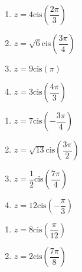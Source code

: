 \documentclass{ximera}
\begin{document}
\begin{multicols}{4} 

\begin{enumerate}

\setcounter{enumi}{\value{HW}}

\item $z = 4\text{cis}\left(\dfrac{2\pi}{3}\right)$ 
\item $z = \sqrt{6}\text{cis}\left(\dfrac{3\pi}{4}\right)$ 
\item $z = 9\text{cis}\left(\pi\right)$ 
\item $z = 3\text{cis}\left(\dfrac{4\pi}{3}\right)$

\setcounter{HW}{\value{enumi}}

\end{enumerate}

\end{multicols}

\begin{multicols}{4} 

\begin{enumerate}

\setcounter{enumi}{\value{HW}}

\item $z = 7\text{cis}\left(-\dfrac{3\pi}{4}\right)$ 
\item \small $z = \sqrt{13}\text{cis}\left(\dfrac{3\pi}{2}\right)$ \normalsize
\item $z = \dfrac{1}{2}\text{cis}\left(\dfrac{7\pi}{4}\right)$ 
\item $z = 12\text{cis}\left(-\dfrac{\pi}{3}\right)$ 

\setcounter{HW}{\value{enumi}}

\end{enumerate}

\end{multicols}

\begin{multicols}{2} 

\begin{enumerate}

\setcounter{enumi}{\value{HW}}

\item $z = 8\text{cis}\left(\dfrac{\pi}{12}\right)$ 
\item $z = 2\text{cis}\left(\dfrac{7\pi}{8}\right)$ 

\setcounter{HW}{\value{enumi}}

\end{enumerate}

\end{multicols}
\end{document}

